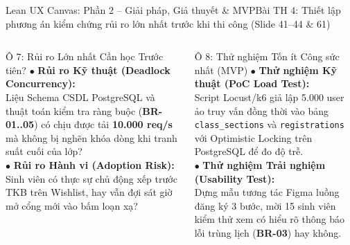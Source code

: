 \documentclass[aspectratio=169, 10pt]{beamer}
\begin{document}
\begin{frame}[t]{Lean UX Canvas: Phần 2 -- Giải pháp, Giả thuyết \& MVP}{Bài TH 4: Thiết lập phương án kiểm chứng rủi ro lớn nhất trước khi thi công (Slide 41--44 \& 61)}
\begin{columns}[T]
      \begin{alertCard}{Ô 7: Rủi ro Lớn nhất Cần học Trước tiên?}
        \tiny
        $\bullet$ \textbf{Rủi ro Kỹ thuật (Deadlock Concurrency):}\\
        Liệu Schema CSDL PostgreSQL và thuật toán kiểm tra ràng buộc (\textbf{BR-01..05}) có chịu được tải \textbf{10.000 req/s} mà không bị nghẽn khóa dòng khi tranh suất cuối của lớp?\\
        $\bullet$ \textbf{Rủi ro Hành vi (Adoption Risk):}\\
        Sinh viên có thực sự chủ động xếp trước TKB trên Wishlist, hay vẫn đợi sát giờ mở cổng mới vào bấm loạn xạ?
      \end{alertCard}
      \vspace{-0.2cm}
      \begin{accentCard}{Ô 8: Thử nghiệm Tốn ít Công sức nhất (MVP)}
        \tiny
        $\bullet$ \textbf{Thử nghiệm Kỹ thuật (PoC Load Test):}\\
        Script Locust/k6 giả lập 5.000 user ảo truy vấn đồng thời vào bảng \texttt{class\_sections} và \texttt{registrations} với Optimistic Locking trên PostgreSQL để đo độ trễ.\\
        $\bullet$ \textbf{Thử nghiệm Trải nghiệm (Usability Test):}\\
        Dựng mẫu tương tác Figma luồng đăng ký 3 bước, mời 15 sinh viên kiểm thử xem có hiểu rõ thông báo lỗi trùng lịch (\textbf{BR-03}) hay không.
      \end{accentCard}
  \end{columns}
\end{frame}
\end{document}
